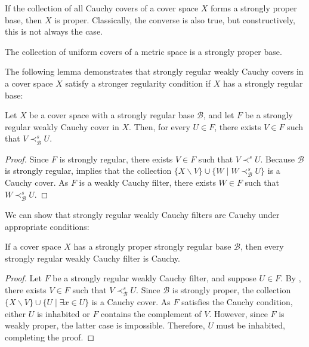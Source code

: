 \documentclass[pdflatex,sn-mathphys-num]{sn-jnl}
\theoremstyle{definition}
\theoremstyle{remark}
\numberwithin{figure}{section}
\newcommand{\rb}{\prec}
\begin{document}
\begin{remark}
If the collection of all Cauchy covers of a cover space $X$ forms a strongly proper base, then $X$ is proper.
Classically, the converse is also true, but constructively, this is not always the case.
\end{remark}

\begin{example}
The collection of uniform covers of a metric space is a strongly proper base.
\end{example}

The following lemma demonstrates that strongly regular weakly Cauchy covers in a cover space $X$ satisfy a stronger regularity condition if $X$ has a strongly regular base:

\begin{lem}
Let $X$ be a cover space with a strongly regular base $\mathcal{B}$, and let $F$ be a strongly regular weakly Cauchy cover in $X$.
Then, for every $U \in F$, there exists $V \in F$ such that $V \rb^s_\mathcal{B} U$.
\end{lem}
\begin{proof}
Since $F$ is strongly regular, there exists $V \in F$ such that $V \rb^s U$.
Because $\mathcal{B}$ is strongly regular,  implies that the collection $\{ X \backslash V \} \cup \{ W \mid W \rb^s_\mathcal{B} U \}$ is a Cauchy cover.
As $F$ is a weakly Cauchy filter, there exists $W \in F$ such that $W \rb^s_\mathcal{B} U$.
\end{proof}

We can show that strongly regular weakly Cauchy filters are Cauchy under appropriate conditions:

\begin{prop}
If a cover space $X$ has a strongly proper strongly regular base $\mathcal{B}$, then every strongly regular weakly Cauchy filter is Cauchy.
\end{prop}
\begin{proof}
Let $F$ be a strongly regular weakly Cauchy filter, and suppose $U \in F$.
By , there exists $V \in F$ such that $V \rb^s_\mathcal{B} U$.
Since $\mathcal{B}$ is strongly proper, the collection $\{ X \backslash V \} \cup \{ U \mid \exists x \in U \}$ is a Cauchy cover.
As $F$ satisfies the Cauchy condition, either $U$ is inhabited or $F$ contains the complement of $V$.
However, since $F$ is weakly proper, the latter case is impossible.
Therefore, $U$ must be inhabited, completing the proof.
\end{proof}
\end{document}
